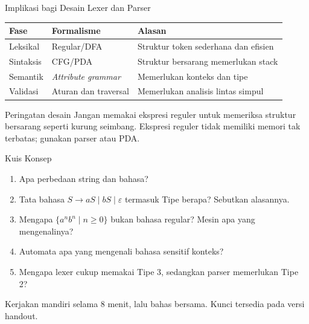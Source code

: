 \documentclass[aspectratio=169,10pt,t]{beamer}
\begin{document}
\begin{frame}{Implikasi bagi Desain Lexer dan Parser}
  \small
  \setlength{\tabcolsep}{4pt}
  \begin{tabular}{@{}p{3.0cm}p{3.5cm}p{7.0cm}@{}}
    \toprule
    \textbf{Fase} & \textbf{Formalisme} & \textbf{Alasan} \\
    \midrule
    Leksikal & Regular/DFA & Struktur token sederhana dan efisien \\
    Sintaksis & CFG/PDA & Struktur bersarang memerlukan stack \\
    Semantik & \textit{Attribute grammar} & Memerlukan konteks dan tipe \\
    Validasi & Aturan dan traversal & Memerlukan analisis lintas simpul \\
    \bottomrule
  \end{tabular}

  \vspace{5pt}
  \begin{block}{Peringatan desain}
    \footnotesize
    Jangan memakai ekspresi reguler untuk memeriksa struktur bersarang
    seperti kurung seimbang. Ekspresi reguler tidak memiliki memori tak
    terbatas; gunakan parser atau PDA.
  \end{block}
\end{frame}

\begin{frame}{Kuis Konsep}
  \small
  \begin{enumerate}
    \setlength{\itemsep}{3pt}
    \item Apa perbedaan string dan bahasa?
    \item Tata bahasa \(S \to aS \mid bS \mid \varepsilon\) termasuk
          Tipe berapa? Sebutkan alasannya.
    \item Mengapa \(\{a^n b^n \mid n \ge 0\}\) bukan bahasa regular?
          Mesin apa yang mengenalinya?
    \item Automata apa yang mengenali bahasa sensitif konteks?
    \item Mengapa lexer cukup memakai Tipe 3, sedangkan parser
          memerlukan Tipe 2?
  \end{enumerate}

  \vspace{4pt}
  {\footnotesize\color{ubbblue!75}Kerjakan mandiri selama 8 menit,
  lalu bahas bersama. Kunci tersedia pada versi handout.}
\end{frame}
\end{document}
